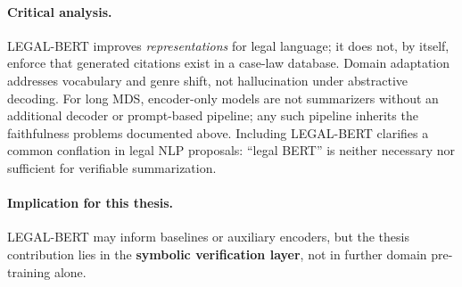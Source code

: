 \paragraph{Critical analysis.}
LEGAL-BERT improves \emph{representations} for legal language; it does not, by itself, enforce that generated citations exist in a case-law database. Domain adaptation addresses vocabulary and genre shift, not hallucination under abstractive decoding. For long MDS, encoder-only models are not summarizers without an additional decoder or prompt-based pipeline; any such pipeline inherits the faithfulness problems documented above. Including LEGAL-BERT clarifies a common conflation in legal NLP proposals: ``legal BERT'' is neither necessary nor sufficient for verifiable summarization.

\paragraph{Implication for this thesis.}
LEGAL-BERT may inform baselines or auxiliary encoders, but the thesis contribution lies in the \textbf{symbolic verification layer}, not in further domain pre-training alone.
